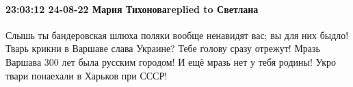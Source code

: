  
 
 
 
 

\paragraph{23:03:12 24-08-22 Мария Тихоноваreplied to Светлана}

Слышь ты бандеровская шлюха поляки вообще ненавидят вас; вы для них быдло!
Тварь крикни в Варшаве слава Украине? Тебе голову сразу отрежут! Мразь Варшава
300 лет была русским городом! И ещё мразь нет у тебя родины! Укро твари
понаехали в Харьков при СССР!







